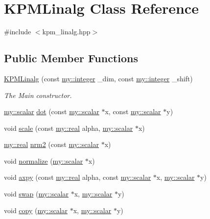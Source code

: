 \hypertarget{classKPMLinalg}{\section{K\+P\+M\+Linalg Class Reference}
\label{classKPMLinalg}
}


{\ttfamily \#include $<$kpm\+\_\+linalg.\+hpp$>$}

\subsection*{Public Member Functions}
\begin{DoxyCompactItemize}
\item 
\hyperlink{classKPMLinalg_acff81426f0aeee30394be706a6e46935}{K\+P\+M\+Linalg} (const \hyperlink{namespacemy_a42365393c537edae1e89d20ff90d1923}{my\+::integer} \+\_\+dim, const \hyperlink{namespacemy_a42365393c537edae1e89d20ff90d1923}{my\+::integer} \+\_\+shift)
\begin{DoxyCompactList}\small\item\em The Main constructor. \end{DoxyCompactList}\item 
\hyperlink{namespacemy_a12d9dde7e2fb58fbd11051705c382a86}{my\+::scalar} \hyperlink{classKPMLinalg_abb6030c99d8057a7aa11fbce306b9b57}{dot} (const \hyperlink{namespacemy_a12d9dde7e2fb58fbd11051705c382a86}{my\+::scalar} $\ast$x, const \hyperlink{namespacemy_a12d9dde7e2fb58fbd11051705c382a86}{my\+::scalar} $\ast$y)
\item 
void \hyperlink{classKPMLinalg_a0f8a1454920849639565fbb0adb1482d}{scale} (const \hyperlink{namespacemy_ad61baeaeda728a4c48dd64f93e44a46c}{my\+::real} alpha, \hyperlink{namespacemy_a12d9dde7e2fb58fbd11051705c382a86}{my\+::scalar} $\ast$x)
\item 
\hyperlink{namespacemy_ad61baeaeda728a4c48dd64f93e44a46c}{my\+::real} \hyperlink{classKPMLinalg_a6ab17fb92464d4209fc81ead7802c22b}{nrm2} (const \hyperlink{namespacemy_a12d9dde7e2fb58fbd11051705c382a86}{my\+::scalar} $\ast$x)
\item 
void \hyperlink{classKPMLinalg_ace41c2567adb04803e03ab62cf5818cc}{normalize} (\hyperlink{namespacemy_a12d9dde7e2fb58fbd11051705c382a86}{my\+::scalar} $\ast$x)
\item 
void \hyperlink{classKPMLinalg_abe74d250559b3c5d13640dc7a4af1f54}{axpy} (const \hyperlink{namespacemy_ad61baeaeda728a4c48dd64f93e44a46c}{my\+::real} alpha, const \hyperlink{namespacemy_a12d9dde7e2fb58fbd11051705c382a86}{my\+::scalar} $\ast$x, \hyperlink{namespacemy_a12d9dde7e2fb58fbd11051705c382a86}{my\+::scalar} $\ast$y)
\item 
void \hyperlink{classKPMLinalg_afa205542a571b92d90ba32d12934baf5}{swap} (\hyperlink{namespacemy_a12d9dde7e2fb58fbd11051705c382a86}{my\+::scalar} $\ast$x, \hyperlink{namespacemy_a12d9dde7e2fb58fbd11051705c382a86}{my\+::scalar} $\ast$y)
\item 
void \hyperlink{classKPMLinalg_ae381d126d8238bee08b1727d11e43133}{copy} (\hyperlink{namespacemy_a12d9dde7e2fb58fbd11051705c382a86}{my\+::scalar} $\ast$x, \hyperlink{namespacemy_a12d9dde7e2fb58fbd11051705c382a86}{my\+::scalar} $\ast$y)
\end{DoxyCompactItemize}
